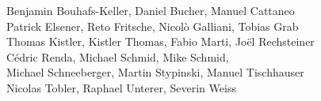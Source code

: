 %
%
%
Benjamin Bouhafs-Keller,	%
Daniel Bucher, 			%
Manuel Cattaneo%
\\
Patrick Elsener,		%
Reto Fritsche,			%
Nicolò Galliani,		%
Tobias Grab%
\\
Thomas Kistler,		%
Kistler Thomas,		%
Fabio Marti,			%
Joël Rechsteiner%
\\
Cédric Renda,			%
Michael Schmid,			%
Mike Schmid,			%
\\
Michael Schneeberger,		%
Martin Stypinski,		%
Manuel Tischhauser%
\\
Nicolas Tobler,			%
Raphael Unterer,		%
Severin Weiss%
